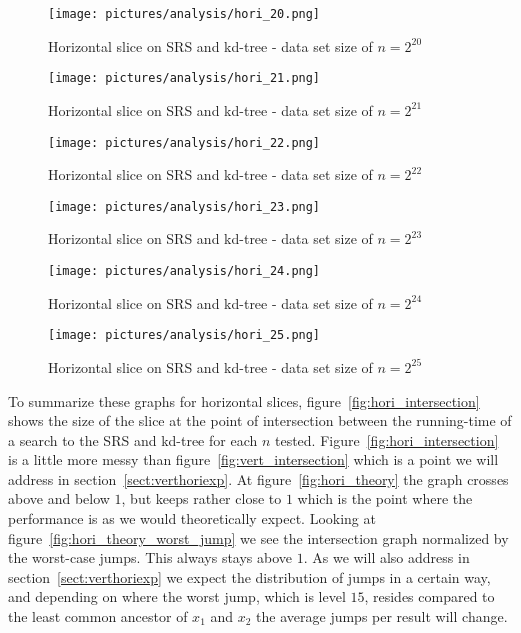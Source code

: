 \begin{figure}[h]
    \centering
    \texttt{[image: pictures/analysis/hori\_20.png]}
    \caption{Horizontal slice on SRS and kd-tree - data set size of $n=2^{20}$}\label{fig:hori_20}
\end{figure}

\begin{figure}[h]
    \centering
    \texttt{[image: pictures/analysis/hori\_21.png]}
    \caption{Horizontal slice on SRS and kd-tree - data set size of $n=2^{21}$}\label{fig:hori_21}
\end{figure}

\begin{figure}[h]
    \centering
    \texttt{[image: pictures/analysis/hori\_22.png]}
    \caption{Horizontal slice on SRS and kd-tree - data set size of $n=2^{22}$}\label{fig:hori_22}
\end{figure}

\begin{figure}[h]
    \centering
    \texttt{[image: pictures/analysis/hori\_23.png]}
    \caption{Horizontal slice on SRS and kd-tree - data set size of $n=2^{23}$}\label{fig:hori_23}
\end{figure}

\begin{figure}[h]
    \centering
    \texttt{[image: pictures/analysis/hori\_24.png]}
    \caption{Horizontal slice on SRS and kd-tree - data set size of $n=2^{24}$}\label{fig:hori_24}
\end{figure}

\begin{figure}[h]
    \centering
    \texttt{[image: pictures/analysis/hori\_25.png]}
    \caption{Horizontal slice on SRS and kd-tree - data set size of $n=2^{25}$}\label{fig:hori_25}
\end{figure}


To summarize these graphs for horizontal slices, figure~\ref{fig:hori_intersection} shows the size of the slice at the point of intersection between the running-time of a search to the SRS and kd-tree for each $n$ tested. Figure~\ref{fig:hori_intersection} is a little more messy than figure~\ref{fig:vert_intersection} which is a point we will address in section~\ref{sect:verthoriexp}. At figure~\ref{fig:hori_theory} the graph crosses above and below $1$, but keeps rather close to $1$ which is the point where the performance is as we would theoretically expect. Looking at figure~\ref{fig:hori_theory_worst_jump} we see the intersection graph normalized by the worst-case jumps. This always stays above $1$. As we will also address in section~\ref{sect:verthoriexp} we expect the distribution of jumps in a certain way, and depending on where the worst jump, which is level $15$, resides compared to the least common ancestor of $x_1$ and $x_2$ the average jumps per result will change.

